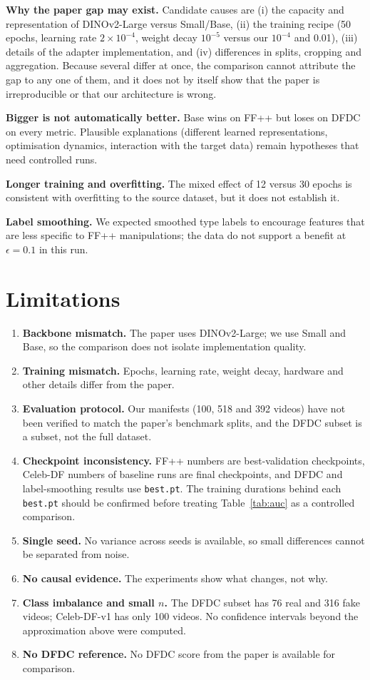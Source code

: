 \documentclass[lettersize,journal]{IEEEtran}
\begin{document}
\textbf{Why the paper gap may exist.} Candidate causes are (i) the capacity and representation of DINOv2-Large versus Small/Base, (ii) the training recipe (50 epochs, learning rate $2\times10^{-4}$, weight decay $10^{-5}$ versus our $10^{-4}$ and 0.01), (iii) details of the adapter implementation, and (iv) differences in splits, cropping and aggregation. Because several differ at once, the comparison cannot attribute the gap to any one of them, and it does not by itself show that the paper is irreproducible or that our architecture is wrong.

\textbf{Bigger is not automatically better.} Base wins on FF++ but loses on DFDC on every metric. Plausible explanations (different learned representations, optimisation dynamics, interaction with the target data) remain hypotheses that need controlled runs.

\textbf{Longer training and overfitting.} The mixed effect of 12 versus 30 epochs is consistent with overfitting to the source dataset, but it does not establish it.

\textbf{Label smoothing.} We expected smoothed type labels to encourage features that are less specific to FF++ manipulations; the data do not support a benefit at $\epsilon=0.1$ in this run.

\section{Limitations}\label{sec:lim}
\begin{enumerate}
\item \textbf{Backbone mismatch.} The paper uses DINOv2-Large; we use Small and Base, so the comparison does not isolate implementation quality.
\item \textbf{Training mismatch.} Epochs, learning rate, weight decay, hardware and other details differ from the paper.
\item \textbf{Evaluation protocol.} Our manifests (100, 518 and 392 videos) have not been verified to match the paper's benchmark splits, and the DFDC subset is a subset, not the full dataset.
\item \textbf{Checkpoint inconsistency.} FF++ numbers are best-validation checkpoints, Celeb-DF numbers of baseline runs are final checkpoints, and DFDC and label-smoothing results use \texttt{best.pt}. The training durations behind each \texttt{best.pt} should be confirmed before treating Table~\ref{tab:auc} as a controlled comparison.
\item \textbf{Single seed.} No variance across seeds is available, so small differences cannot be separated from noise.
\item \textbf{No causal evidence.} The experiments show what changes, not why.
\item \textbf{Class imbalance and small $n$.} The DFDC subset has 76 real and 316 fake videos; Celeb-DF-v1 has only 100 videos. No confidence intervals beyond the approximation above were computed.
\item \textbf{No DFDC reference.} No DFDC score from the paper is available for comparison.
\end{enumerate}
\end{document}
